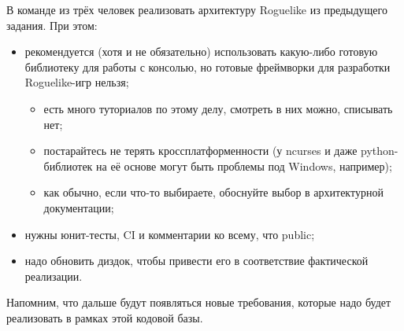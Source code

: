 \documentclass[a5paper]{homework}
\begin{document}

В команде из трёх человек реализовать архитектуру Roguelike из предыдущего задания. При этом:

\begin{itemize}
    \item рекомендуется (хотя и не обязательно) использовать какую-либо готовую библиотеку для работы с консолью, но готовые фреймворки для разработки Roguelike-игр нельзя;
    \begin{itemize}
        \item есть много туториалов по этому делу, смотреть в них можно, списывать нет;
        \item постарайтесь не терять кроссплатформенности (у ncurses и даже python-библиотек на её основе могут быть проблемы под Windows, например);
        \item как обычно, если что-то выбираете, обоснуйте выбор в архитектурной документации;
    \end{itemize}
    \item нужны юнит-тесты, CI и комментарии ко всему, что public;
    \item надо обновить диздок, чтобы привести его в соответствие фактической реализации.
\end{itemize}

Напомним, что дальше будут появляться новые требования, которые надо будет реализовать в рамках этой кодовой базы.
\end{document}
